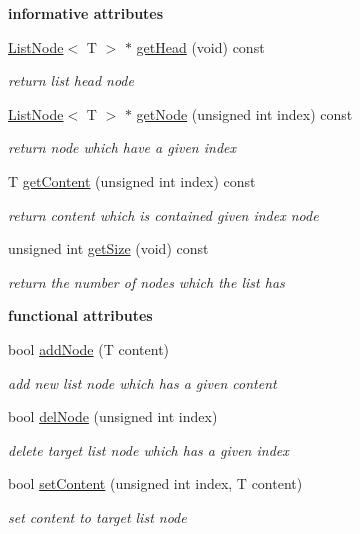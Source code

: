 \begin{Indent}{\bf informative attributes}\par
\begin{DoxyCompactItemize}
\item 
\hyperlink{class_list_node}{List\-Node}$<$ T $>$ $\ast$ \hyperlink{class_list_ac9a6fc5576665cb954e83e322f7fe6ed}{get\-Head} (void) const 
\begin{DoxyCompactList}\small\item\em return list head node \end{DoxyCompactList}\item 
\hyperlink{class_list_node}{List\-Node}$<$ T $>$ $\ast$ \hyperlink{class_list_a5aaa131805b461db4664a5dc7a28d7a9}{get\-Node} (unsigned int index) const 
\begin{DoxyCompactList}\small\item\em return node which have a given index \end{DoxyCompactList}\item 
T \hyperlink{class_list_aa93404b4c7f3f86a560a0a675f55c9bd}{get\-Content} (unsigned int index) const 
\begin{DoxyCompactList}\small\item\em return content which is contained given index node \end{DoxyCompactList}\item 
unsigned int \hyperlink{class_list_a4d8d3acaf718d470e1084814a6155814}{get\-Size} (void) const 
\begin{DoxyCompactList}\small\item\em return the number of nodes which the list has \end{DoxyCompactList}\end{DoxyCompactItemize}
\end{Indent}
\begin{Indent}{\bf functional attributes}\par
\begin{DoxyCompactItemize}
\item 
bool \hyperlink{class_list_ac8fff7396766358cee488223009ac578}{add\-Node} (T content)
\begin{DoxyCompactList}\small\item\em add new list node which has a given content \end{DoxyCompactList}\item 
bool \hyperlink{class_list_af4e9e7db2b56cd948ec225445f3250da}{del\-Node} (unsigned int index)
\begin{DoxyCompactList}\small\item\em delete target list node which has a given index \end{DoxyCompactList}\item 
bool \hyperlink{class_list_adfc10aaf74f0ffc4a48b6ed46c192093}{set\-Content} (unsigned int index, T content)
\begin{DoxyCompactList}\small\item\em set content to target list node \end{DoxyCompactList}\end{DoxyCompactItemize}
\end{Indent}
